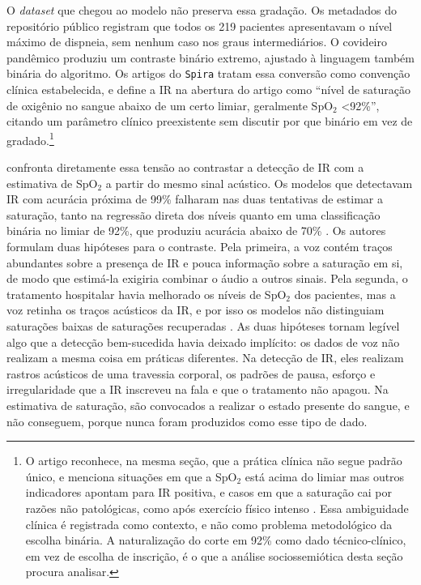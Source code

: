 O \textit{dataset} que chegou ao modelo não preserva essa gradação. Os metadados do repositório público registram que todos os 219 pacientes apresentavam o nível máximo de dispneia, sem nenhum caso nos graus intermediários. O covideiro pandêmico produziu um contraste binário extremo, ajustado à linguagem também binária do algoritmo. Os artigos do \texttt{Spira} tratam essa conversão como convenção clínica estabelecida, e \textcite{Gauy2024Discriminant} define a IR na abertura do artigo como \enquote{nível de saturação de oxigênio no sangue abaixo de um certo limiar, geralmente SpO$_2$ <92\%}, citando um parâmetro clínico preexistente sem discutir por que binário em vez de gradado.\footnote{O artigo reconhece, na mesma seção, que a prática clínica não segue padrão único, e menciona situações em que a SpO$_2$ está acima do limiar mas outros indicadores apontam para IR positiva, e casos em que a saturação cai por razões não patológicas, como após exercício físico intenso \parencite{Gauy2024Discriminant}. Essa ambiguidade clínica é registrada como contexto, e não como problema metodológico da escolha binária. A naturalização do corte em 92\% como dado técnico-clínico, em vez de escolha de inscrição, é o que a análise sociossemiótica desta seção procura analisar.}

\textcite{Gauy2025Contrasting} confronta diretamente essa tensão ao contrastar a detecção de IR com a estimativa de SpO$_2$ a partir do mesmo sinal acústico. Os modelos que detectavam IR com acurácia próxima de 99\% falharam nas duas tentativas de estimar a saturação, tanto na regressão direta dos níveis quanto em uma classificação binária no limiar de 92\%, que produziu acurácia abaixo de 70\% \parencite{Gauy2025Contrasting}. Os autores formulam duas hipóteses para o contraste. Pela primeira, a voz contém traços abundantes sobre a presença de IR e pouca informação sobre a saturação em si, de modo que estimá-la exigiria combinar o áudio a outros sinais. Pela segunda, o tratamento hospitalar havia melhorado os níveis de SpO$_2$ dos pacientes, mas a voz retinha os traços acústicos da IR, e por isso os modelos não distinguiam saturações baixas de saturações recuperadas \parencite{Gauy2025Contrasting}. As duas hipóteses tornam legível algo que a detecção bem-sucedida havia deixado implícito: os dados de voz não realizam a mesma coisa em práticas diferentes. Na detecção de IR, eles realizam rastros acústicos de uma travessia corporal, os padrões de pausa, esforço e irregularidade que a IR inscreveu na fala e que o tratamento não apagou. Na estimativa de saturação, são convocados a realizar o estado presente do sangue, e não conseguem, porque nunca foram produzidos como esse tipo de dado.

